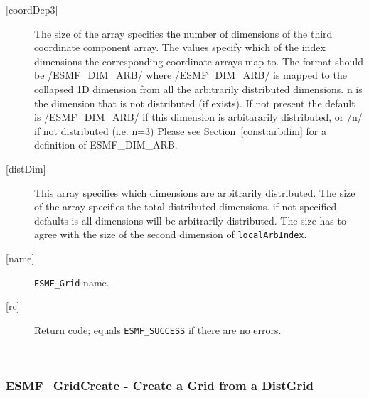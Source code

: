 \begin{description}
   \item[{[coordDep3]}]
       The size of the array specifies the number of dimensions of the
       third coordinate component array. The values specify which
       of the index dimensions the corresponding coordinate
       arrays map to. The format should be /ESMF\_DIM\_ARB/ where
       /ESMF\_DIM\_ARB/ is mapped to the collapsed 1D dimension from all
       the arbitrarily distributed dimensions.  n is the dimension that
       is not distributed (if exists).
       If not present the default is /ESMF\_DIM\_ARB/ if this dimension
       is arbitararily distributed, or /n/ if not distributed (i.e. n=3)
        Please see Section~\ref{const:arbdim} for a definition of ESMF\_DIM\_ARB.
   \item[{[distDim]}]
         This array specifies which dimensions are arbitrarily distributed.
         The size of the array specifies the total distributed dimensions.
         if not specified, defaults is all dimensions will be arbitrarily
         distributed.  The size has to agree with the size of the second
         dimension of {\tt localArbIndex}.
   \item[{[name]}]
            {\tt ESMF\_Grid} name.
   \item[{[rc]}]
        Return code; equals {\tt ESMF\_SUCCESS} if there are no errors.
   \end{description}
   
 
\mbox{}\hrulefill\ 
 
\subsubsection [ESMF\_GridCreate] {ESMF\_GridCreate - Create a Grid from a DistGrid}


